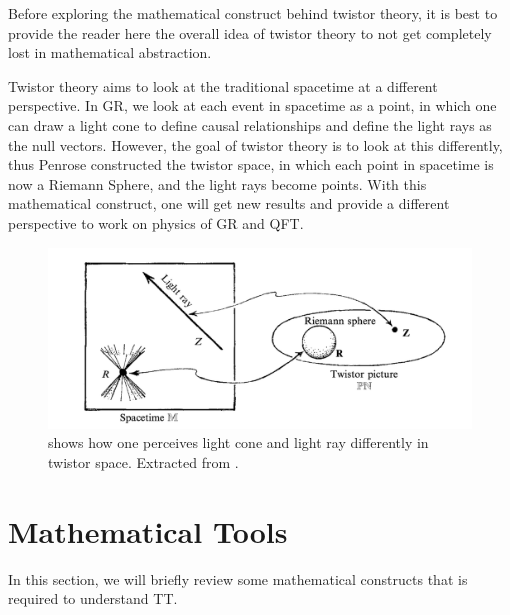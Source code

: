 \documentclass{article}
\begin{document}
Before exploring the mathematical construct behind twistor theory, it 
is best to provide the reader here the overall idea of twistor theory to not
get completely lost in mathematical abstraction. 

Twistor theory aims to look at the traditional spacetime at a different
perspective. In GR, we look at each event in spacetime as a point, in
which one can draw a light cone to define causal relationships and define
the light rays as the null vectors. However, the goal of twistor theory is to
look at this differently, thus Penrose constructed the twistor
space, in which each point in spacetime is now a Riemann Sphere, and the
light rays become points. With this mathematical construct, one will get new
results and provide a different perspective to work on physics of GR and QFT.

\begin{figure}
\begin{center}
  \includegraphics[scale=0.5]{Figures/twistorspacevisual.png}
\end{center}
\caption{shows how one perceives light cone and light ray differently
  in twistor space. Extracted from \cite{road}. }
\label{fig:}
\end{figure}

\section{Mathematical Tools}

In this section, we will briefly review some mathematical constructs
that is required to understand TT.
\end{document}
